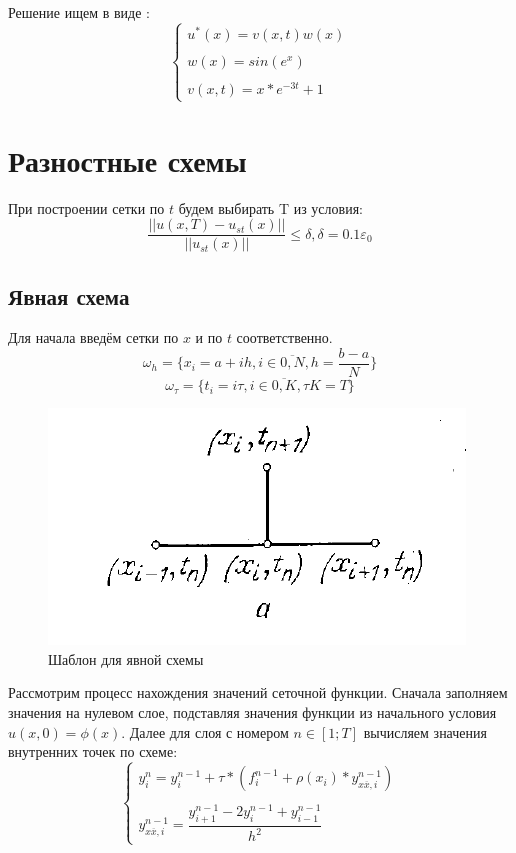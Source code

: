 \documentclass[12pt]{article}
\begin{document}
Решение ищем в виде : 
$$
\begin{cases}
u^*(x) = v(x, t)w(x) \\ \\
w(x) = sin(e^x) \\ \\
v(x, t) = x*e^{-3t}+1
\end{cases}
$$ 


\section{Разностные схемы}
При построении сетки по $t$ будем выбирать T из условия:
$$
\dfrac{||u(x, T) - u_{st}(x)||}{||u_{st}(x)||} \leq \delta, \delta = 0.1 \varepsilon_0
$$
\subsection{Явная схема}
Для начала введём сетки по $x$ и по $t$ соответственно.
$$
\omega_h = \{x_i = a + ih, i \in \overline{0,N}, h = \dfrac{b - a}{N}\} 
$$
$$
\omega_\tau = \{t_i = i\tau, i \in \overline{0,K}, \tau K = T \} 
$$

\begin{figure}[h]
\begin{center}
\includegraphics[scale = 0.8]{exp.png} 
\end{center}
\caption{Шаблон для явной схемы}
\end{figure}


Рассмотрим процесс нахождения значений сеточной функции. Сначала заполняем значения на нулевом слое, подставляя значения функции из начального условия $u(x, 0) = \phi(x)$. Далее для слоя с номером $n \in [1; T]$ вычисляем значения внутренних точек по схеме:
$$
\begin{cases}
y_i^n = y_i^{n-1} + \tau*(f_i^{n-1} + \rho(x_i)*y_{x\overline{x}, i}^{n-1}) \\ \\ 
y_{x\overline{x}, i}^{n-1} = \dfrac{y_{i+1}^{n-1} - 2y_i^{n-1} + y_{i-1}^{n-1}}{h^2}
\end{cases}
$$
\end{document}
